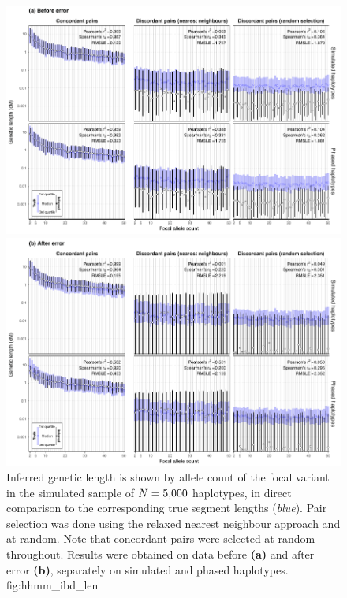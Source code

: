

\begin{figure}[p]
\vspace*{-5pt}
\includegraphics[width=\textwidth]{./img/ch5/hhmm_ibd_len_A}
\includegraphics[width=\textwidth]{./img/ch5/hhmm_ibd_len_B}
{Inferred genetic length is shown by allele count of the focal variant in the simulated sample of ${N=\n{5000}}$ haplotypes, in direct comparison to the corresponding true segment lengths (\emph{blue}).
Pair selection was done using the relaxed nearest neighbour approach and at random.
Note that concordant pairs were selected at random throughout.
Results were obtained on data before \textbf{(a)} and after error \textbf{(b)}, separately on simulated and phased haplotypes.}
{fig:hhmm_ibd_len}
\end{figure}
